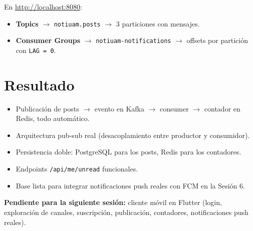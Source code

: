 En \url{http://localhost:8080}:

\begin{itemize}[leftmargin=*]
  \item \textbf{Topics} $\rightarrow$ \texttt{notiuam.posts} $\rightarrow$ 3 particiones con mensajes.
  \item \textbf{Consumer Groups} $\rightarrow$ \texttt{notiuam-notifications} $\rightarrow$ offsets por partición con \texttt{LAG = 0}.
\end{itemize}

\section{Resultado}

\begin{exito}
\begin{itemize}[leftmargin=*]
  \item Publicación de posts $\rightarrow$ evento en Kafka $\rightarrow$ consumer $\rightarrow$ contador en Redis, todo automático.
  \item Arquitectura pub-sub real (desacoplamiento entre productor y consumidor).
  \item Persistencia doble: PostgreSQL para los posts, Redis para los contadores.
  \item Endpoints \texttt{/api/me/unread} funcionales.
  \item Base lista para integrar notificaciones push reales con FCM en la Sesión 6.
\end{itemize}
\end{exito}

\textbf{Pendiente para la siguiente sesión:} cliente móvil en Flutter (login, exploración de canales, suscripción, publicación, contadores, notificaciones push reales).
